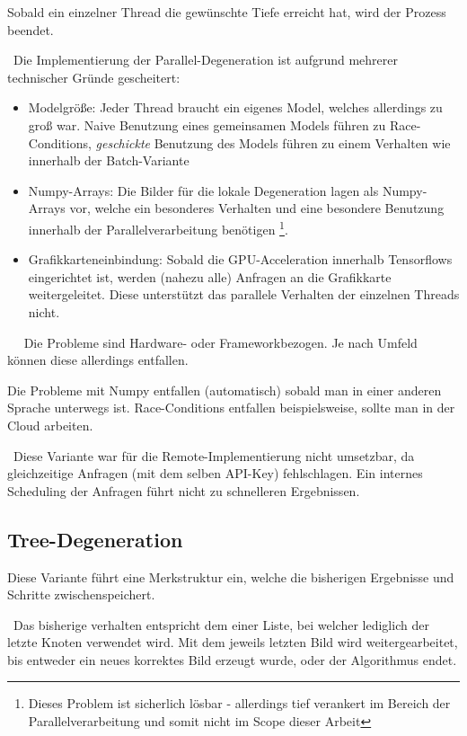 Sobald ein einzelner Thread die gewünschte Tiefe erreicht hat, wird der Prozess beendet. 

~\newline Die Implementierung der Parallel-Degeneration ist aufgrund mehrerer technischer Gründe gescheitert: 

\begin{itemize}
	\item Modelgröße: Jeder Thread braucht ein eigenes Model, welches allerdings zu groß war. Naive Benutzung eines gemeinsamen Models führen zu Race-Conditions, \textit{geschickte} Benutzung des Models führen zu einem Verhalten wie innerhalb der Batch-Variante
	\item Numpy-Arrays: Die Bilder für die lokale Degeneration lagen als Numpy-Arrays vor, welche ein besonderes Verhalten und eine besondere Benutzung innerhalb der Parallelverarbeitung benötigen \footnote{Dieses Problem ist sicherlich lösbar - allerdings tief verankert im Bereich der Parallelverarbeitung und somit nicht im Scope dieser Arbeit}. 
	\item Grafikkarteneinbindung: Sobald die GPU-Acceleration innerhalb Tensorflows eingerichtet ist, werden (nahezu alle) Anfragen an die Grafikkarte weitergeleitet. Diese unterstützt das parallele Verhalten der einzelnen Threads nicht. 
\end{itemize} 
~\newline ~\newline
Die Probleme sind Hardware- oder Frameworkbezogen. Je nach Umfeld können diese allerdings entfallen. 

Die Probleme mit Numpy entfallen (automatisch) sobald man in einer anderen Sprache unterwegs ist. Race-Conditions entfallen beispielsweise, sollte man in der Cloud arbeiten.

~\newline Diese Variante war für die Remote-Implementierung nicht umsetzbar, da gleichzeitige Anfragen (mit dem selben API-Key) fehlschlagen. Ein internes Scheduling der Anfragen führt nicht zu schnelleren Ergebnissen. 
\subsection{Tree-Degeneration}
Diese Variante führt eine Merkstruktur ein, welche die bisherigen Ergebnisse und Schritte zwischenspeichert. 

~\newline Das bisherige verhalten entspricht dem einer Liste, bei welcher lediglich der letzte Knoten verwendet wird. Mit dem jeweils letzten Bild wird weitergearbeitet, bis entweder ein neues korrektes Bild erzeugt wurde, oder der Algorithmus endet. 

